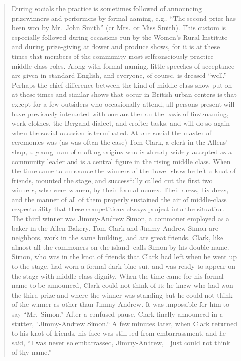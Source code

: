 \documentclass[openany,nobib]{tufte-book}
\begin{document}
\begin{quote}
During socials the practice is sometimes followed of announcing
prizewinners and performers by formal naming, e.g., ``The second prize
has been won by Mr.~John Smith'' (or Mrs.~or Miss Smith). This custom is
especially followed during occasions run by the Women's Rural Institute
and during prize-giving at flower and produce shows, for it is at these
times that members of the community most selfconsciously practice
middle-class roles. Along with formal naming, little speeches of
acceptance are given in standard English, and everyone, of course, is
dressed ``well.'' Perhaps the chief difference between the kind of
middle-class show put on at these times and similar shows that occur in
British urban centers is that except for a few outsiders who
occasionally attend, all persons present will have previously interacted
with one another on the basis of first-naming, work clothes, the Bergand
dialect, and crofter tasks, and will do so again when the social
occasion is terminated. At one social the master of ceremonies was (as
was often the case) Tom Clark, a clerk in the Allens' shop, a young man
of crofting origins who is already widely accepted as a community leader
and is a central figure in the rising middle class. When the time came
to announce the winners of the flower show he left a knot of friends,
mounted the stage, and successfully called out the first two winners,
who were women, by their formal names. Their dress, his dress, and the
manner of all of them properly sustained the air of middle-class
respectability that these competitions always project into the
situation. The third winner was Jimmy-Andrew Simon, a commoner employed
as a baker in the Allen Bakery. Tom Clark and Jimmy-Andrew Simon are
neighbors, work in the same building, and are great friends. Clark, like
almost all the commoners on the island, calls Simon by his double name.
Simon, who was in the knot of friends that Clark had left when he went
up to the stage, had worn a formal dark blue suit and was ready to
appear on the stage with middle-class dignity. When the time came for
his formal name to be announced, Clark could not think of it; he knew
who had won the third prize and where the winner was standing but he
could not think of the winner as other than Jimmy-Andrew. It was
impossible for him to say ``Mr.~Simon.'' After a confused pause, Clark
finally announced in a stutter, ``Jimmy-Andrew Simon.`` A few minutes
later, when Clark returned to his knot of friends, his face was still
red from embarrassment, and he said, ``I was never so embarrassed,
Jimmy-Andrew, I just could not think of thy name.''
\end{quote}
\end{document}
